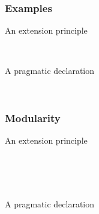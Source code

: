 \begin{frame}
\frametitle{Examples}
\begin{block}{An extension principle}
\begin{twelfsig}
\\
\end{twelfsig}
\end{block}

\begin{block}{A pragmatic declaration}
\vspace{-.3em}
\begin{twelfsig}
\\
\end{twelfsig}
\end{block}
\end{frame}


\begin{frame}
\frametitle{Modularity}
\begin{block}{An extension principle}
\vspace{-.3em}
\begin{twelfsig}
\tsig{\Theorems}\\
\tmeta{\Forms}{}\\
\\
\tsigend
\end{twelfsig}
\vspace{-.3em}
\end{block}

\begin{block}{A pragmatic declaration}
\vspace{-.3em}
\begin{twelfsig}
\tsig{\MyTheorem}\\
\tmeta{\Theorems}{}\\
\\
\\
\tsigend
\end{twelfsig}
\vspace{-.3em}
\end{block}
\end{frame}

